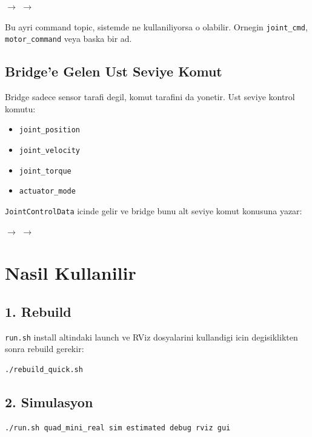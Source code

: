 \documentclass[11pt]{article}
\begin{document}
\begin{center}
$\rightarrow$
$\rightarrow$
\end{center}

Bu ayri command topic, sistemde ne kullaniliyorsa o olabilir. Ornegin \texttt{joint\_cmd}, \texttt{motor\_command} veya baska bir ad.

\subsection*{Bridge'e Gelen Ust Seviye Komut}
Bridge sadece sensor tarafi degil, komut tarafini da yonetir. Ust seviye kontrol komutu:
\begin{itemize}
  \item \texttt{joint\_position}
  \item \texttt{joint\_velocity}
  \item \texttt{joint\_torque}
  \item \texttt{actuator\_mode}
\end{itemize}

\texttt{JointControlData} icinde gelir ve bridge bunu alt seviye komut konusuna yazar:
\begin{center}
$\rightarrow$
$\rightarrow$
\end{center}

\section*{Nasil Kullanilir}
\subsection*{1. Rebuild}
\texttt{run.sh} install altindaki launch ve RViz dosyalarini kullandigi icin degisiklikten sonra rebuild gerekir:
\begin{verbatim}
./rebuild_quick.sh
\end{verbatim}

\subsection*{2. Simulasyon}
\begin{verbatim}
./run.sh quad_mini_real sim estimated debug rviz gui
\end{verbatim}
\end{document}
